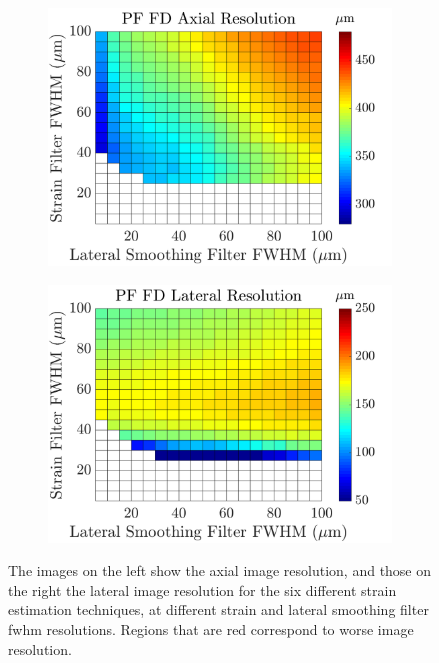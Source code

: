 \begin{figure}[h!]
\begin{subfigure}{0.49\textwidth}
		\includegraphics[width=\textwidth]{imageres_figs/pffd_axial.png}
	\end{subfigure}
	\begin{subfigure}{0.49\textwidth}
		\centering
		\includegraphics[width=\textwidth]{imageres_figs/pffd_lateral.png}
	\end{subfigure}
	\caption{The images on the left show the axial image resolution, and those on the right the lateral image resolution for the six different strain estimation techniques, at different strain and lateral smoothing filter \ac{fwhm} resolutions. Regions that are red correspond to worse image resolution.}
	\label{imageres_figs}
\end{figure}

